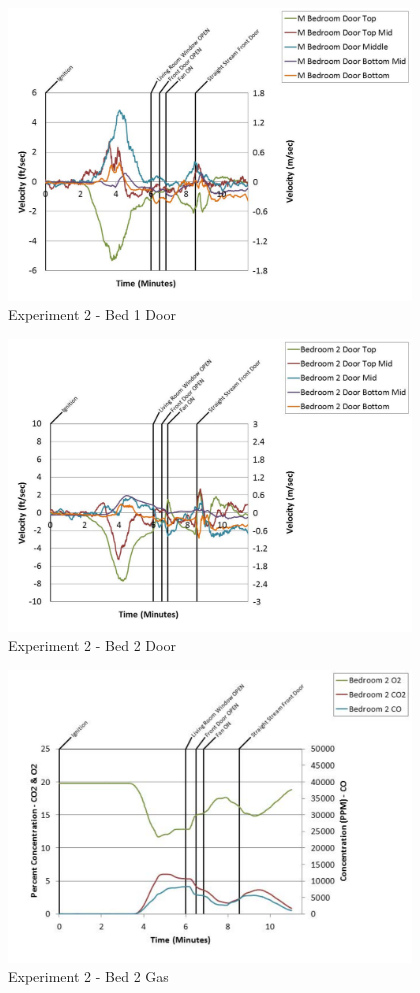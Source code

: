 \documentclass{article}
\begin{document}
\begin{appendices}
	\clearpage

	\begin{figure}[h!]
		\centering
		\includegraphics[height=3.05in]{0_Images/Results_Charts/Exp_2_Charts/Bed1Door.pdf}
		\caption{Experiment 2 - Bed 1 Door}
	\end{figure}
 

	\begin{figure}[h!]
		\centering
		\includegraphics[height=3.05in]{0_Images/Results_Charts/Exp_2_Charts/Bed2Door.pdf}
		\caption{Experiment 2 - Bed 2 Door}
	\end{figure}
 
	\clearpage

	\begin{figure}[h!]
		\centering
		\includegraphics[height=3.05in]{0_Images/Results_Charts/Exp_2_Charts/Bed2Gas.pdf}
		\caption{Experiment 2 - Bed 2 Gas}
	\end{figure}
 


\end{appendices}
\end{document}
